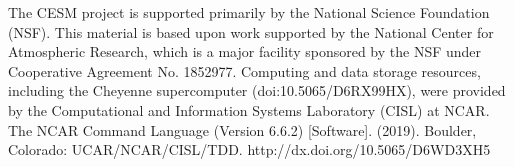 %

\acknowledgments
The CESM project is supported primarily by the National Science Foundation (NSF). This material is based upon work supported by the National Center for Atmospheric Research, which is a major facility sponsored by the NSF under Cooperative Agreement No. 1852977. Computing and data storage resources, including the Cheyenne supercomputer (doi:10.5065/D6RX99HX), were provided by the Computational and Information Systems Laboratory (CISL) at NCAR.
 The NCAR Command Language (Version 6.6.2) [Software]. (2019). Boulder, Colorado: UCAR/NCAR/CISL/TDD. http://dx.doi.org/10.5065/D6WD3XH5